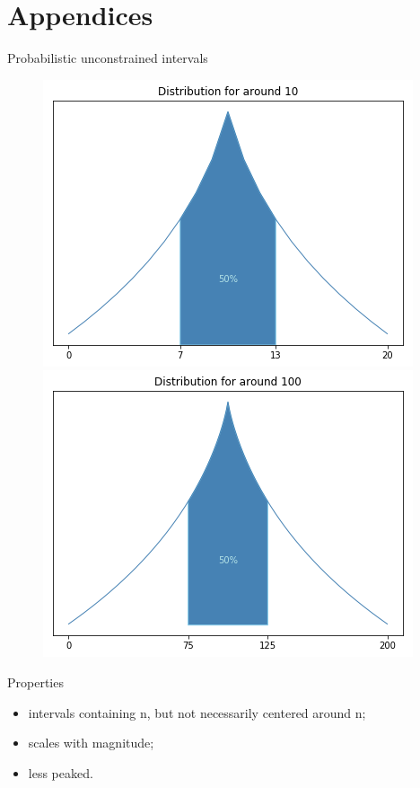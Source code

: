 \documentclass[xcolor=table, hyperref={pdfpagelabels=false}]{beamer}
\begin{document}
\section{Appendices}
\begin{frame}{Probabilistic unconstrained intervals}
\begin{figure}
	\includegraphics[width=.45\textwidth]{./images/around_10_prob_unconstrained.png}
	\includegraphics[width=.45\textwidth]{./images/around_100_prob_unconstrained.png}
\end{figure}

\begin{block}{Properties}
	\begin{itemize}
		\item intervals containing n, but not necessarily centered around n;
		\item scales with magnitude;
		\item less peaked.
	\end{itemize}
\end{block}
\end{frame}
\end{document}
